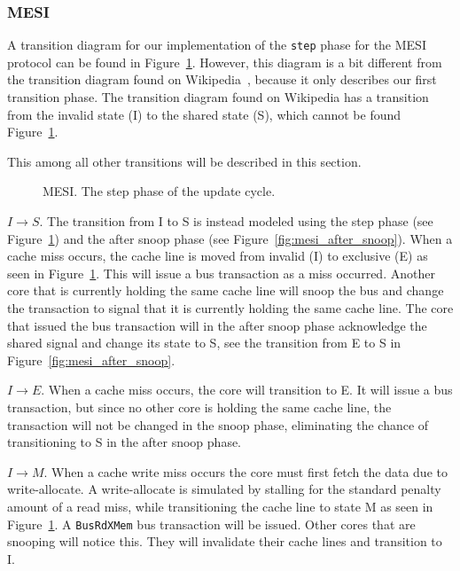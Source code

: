 \subsubsection{MESI}

A transition diagram for our implementation of the \texttt{step} phase for the MESI protocol can be found in Figure~\ref{fig:mesi}.
However, this diagram is a bit different from the transition diagram found on
Wikipedia~\cite{mesi_wiki}, because it only describes our first transition phase.
The transition diagram found on Wikipedia has a transition from the invalid state (I) to the shared
state (S), which cannot be found Figure~\ref{fig:mesi}.

This among all other transitions will be described in this section.


\begin{figure}[H]
    \centering
    \caption{MESI. The step phase of the update cycle.}\label{fig:mesi}
\end{figure}

$I \to S$.
The transition from I to S is instead modeled using the step phase (see Figure~\ref{fig:mesi}) and the after snoop phase (see Figure~\ref{fig:mesi_after_snoop}).
When a cache miss occurs, the cache line is moved from invalid (I) to exclusive (E) as seen in Figure~\ref{fig:mesi}.
This will issue a bus transaction as a miss occurred.
Another core that is currently holding the same cache line will snoop the bus and change the transaction to signal that it is currently holding the same cache line.
The core that issued the bus transaction will in the after snoop phase acknowledge the shared signal and change its state to S, see the transition from E to S in Figure~\ref{fig:mesi_after_snoop}.

$I \to E$.
When a cache miss occurs, the core will transition to E.
It will issue a bus transaction, but since no other core is holding the same cache line, the transaction will not be changed in the snoop phase, eliminating the chance of transitioning to S in the after snoop phase.

$I \to M$.
When a cache write miss occurs the core must first fetch the data due to write-allocate.
A write-allocate is simulated by stalling for the standard penalty amount of a read miss, while transitioning the cache line to state M as seen in Figure~\ref{fig:mesi}.
A \texttt{BusRdXMem} bus transaction will be issued.
Other cores that are snooping will notice this.
They will invalidate their cache lines and transition to I.

